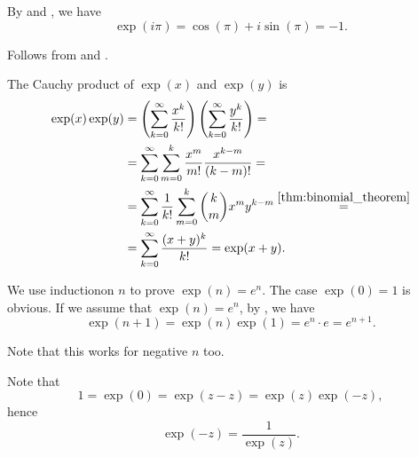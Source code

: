 \begin{RefListProof}
     By  and , we have
    \begin{equation*}
      \exp(i\pi) = \cos(\pi) + i\sin(\pi) = -1.
    \end{equation*}

     Follows from  and .

     The Cauchy product of \( \exp(x) \) and \( \exp(y) \) is
    \begin{align*}
      \exp(x) \exp(y)
      &=
      \left( \sum_{k=0}^\infty \frac {x^k} {k!} \right) \left( \sum_{k=0}^\infty \frac {y^k} {k!} \right)
      = \\ &=
      \sum_{k=0}^\infty \sum_{m=0}^k \frac {x^m} {m!} \frac {x^{k-m}} {(k-m)!}
      = \\ &=
      \sum_{k=0}^\infty \frac 1 {k!} \sum_{m=0}^k \binom{k}{m} x^m y^{k-m}
      \overset {\ref{thm:binomial_theorem}} = \\ &=
      \sum_{k=0}^\infty \frac {(x + y)^k} {k!}
      =
      \exp(x + y).
    \end{align*}

     We use induction\IND on \( n \) to prove \( \exp(n) = e^n \). The case \( \exp(0) = 1 \) is obvious. If we assume that \( \exp(n) = e^n \), by , we have
    \begin{equation*}
      \exp(n + 1)
      =
      \exp(n) \exp(1)
      =
      e^n \cdot e
      =
      e^{n+1}.
    \end{equation*}

    Note that this works for negative \( n \) too.

     Note that
    \begin{equation*}
      1 = \exp(0) = \exp(z - z) = \exp(z) \exp(-z),
    \end{equation*}
    hence
    \begin{equation*}
      \exp(-z) = \frac 1 {\exp(z)}.
    \end{equation*}


\end{RefListProof}

